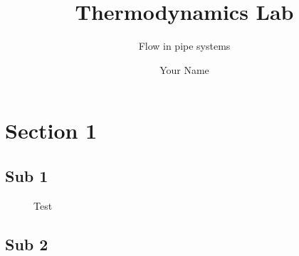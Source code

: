 \documentclass{brookes-assignment}
\author{Your Name}
\title{Thermodynamics Lab}
\subtitle{Flow in pipe systems}
\begin{document}
		
		\maketitle
		
		\section{Section 1}	
			\blindtext
								
			\subsection{Sub 1}
				\blindmathpaper
			
				\begin{figure}[h]
					\centering
					\label{fig:test}
					\caption{Test}
				\end{figure}
				
				\blindtext
				\blindenumerate[10]
				\blindtext
				
			\subsection{Sub 2}
				\blindtext
		

	
\end{document}
